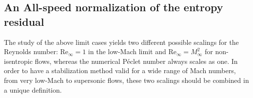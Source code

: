 \documentclass[review,10pt]{elsarticle}
\renewcommand{\Re}{\textrm{Re}}
\newcommand{\Pe}{\textrm{P\'e}}
\newcommand{\eqt}[1]{Eq.~(\ref{#1})}                     %
\begin{document}
%
%
%
%
\subsection{An All-speed normalization of the entropy residual} \label{sec:new_normaliz}

The study of the above limit cases yields two different possible scalings for the Reynolds number: 
$\Re_\infty = 1$ in the low-Mach limit and $\Re_\infty  = M_\infty^2$ for non-isentropic flows, 
whereas the numerical P\'eclet number always scales as one. In order to have a stabilization method 
valid for a wide range of Mach numbers, from very low-Mach to supersonic flows, these two scalings should 
be combined in a unique definition. 
\end{document}
